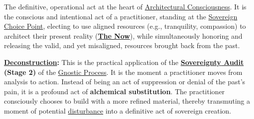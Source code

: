 \item[\hypertarget{gloss:sovereign_choice}{The Sovereign Choice}] 
    The definitive, operational act at the heart of \hyperlink{gloss:architectural_consciousness}{Architectural Consciousness}. It is the conscious and intentional act of a practitioner, standing at the \hyperlink{gloss:sovereign_choice_point}{Sovereign Choice Point}, electing to use aligned resources (e.g., tranquility, compassion) to architect their present reality (\textbf{\hyperlink{gloss:the_now}{The Now}}), while simultaneously honoring and releasing the valid, and yet misaligned, resources brought back from the past.
    \begin{nobullet}
        \item \textbf{\hyperlink{gloss:deconstruction}{Deconstruction}:} This is the practical application of the \textbf{\hyperlink{gloss:sovereignty_audit}{\hyperlink{gloss:sovereignty}{\hyperlink{gloss:sovereignty}{Sovereignty}} Audit} (Stage 2)} of the \hyperlink{gloss:gnostic_process}{Gnostic Process}. It is the moment a practitioner moves from analysis to action. Instead of being an act of suppression or denial of the past's pain, it is a profound act of \textbf{alchemical substitution}. The practitioner consciously chooses to build with a more refined material, thereby transmuting a moment of potential \hyperlink{gloss:disturbance}{disturbance} into a definitive act of sovereign creation.
    \end{nobullet}


